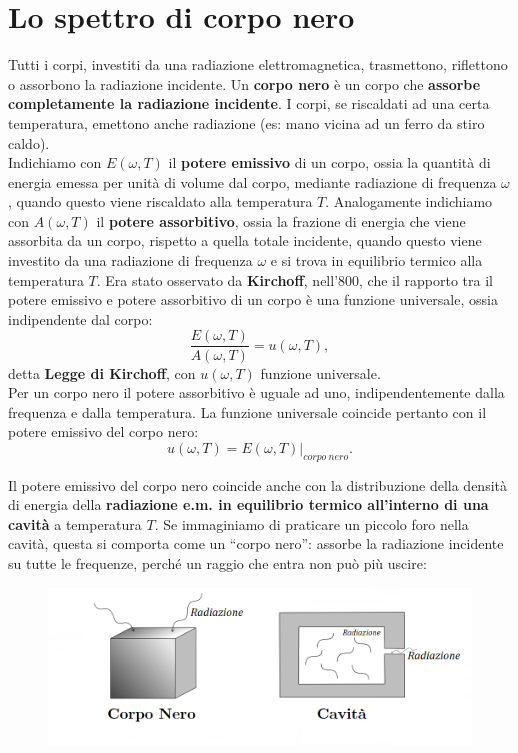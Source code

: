 \documentclass[a4paper,12pt,oneside]{book}
\begin{document}
\section{Lo spettro di corpo nero}
Tutti i corpi, investiti da una radiazione elettromagnetica, trasmettono, riflettono o assorbono la radiazione incidente. Un \textbf{corpo nero} è un corpo che \textbf{assorbe completamente la radiazione incidente}. I corpi, se riscaldati ad una certa temperatura, emettono anche radiazione (es: mano vicina ad un ferro da stiro caldo).\\

Indichiamo con $E(\omega , T) $ il \textbf{potere emissivo} di un corpo, ossia la quantità di energia emessa per unità di volume dal corpo, mediante radiazione di frequenza $\omega$, quando questo viene riscaldato alla temperatura $T$. Analogamente indichiamo con $A(\omega , T )$ il \textbf{potere assorbitivo}, ossia la frazione di energia che viene assorbita da un corpo, rispetto a quella totale incidente, quando questo viene investito da una radiazione di frequenza $\omega$ e si trova in equilibrio termico alla temperatura  $T$.
Era stato osservato da \textbf{Kirchoff}, nell'800, che il rapporto tra il potere emissivo e potere assorbitivo di un corpo è una funzione universale, ossia indipendente dal corpo:
	\begin{equation}
		\boxed{
			\frac{E(\omega ,T)}{A(\omega ,T)}= u(\omega , T),
		}
	\end{equation}
detta \textbf{Legge di Kirchoff}, con $u(\omega , T)$ funzione universale.\\
Per un corpo nero il potere assorbitivo è uguale ad uno, indipendentemente dalla frequenza e dalla temperatura. La funzione universale coincide pertanto con il potere emissivo del corpo nero:
	\begin{equation}
		u(\omega, T)= E(\omega , T)|_{corpo\ nero}.
	\end{equation}
	
Il potere emissivo del corpo nero coincide anche con la distribuzione della densità di energia della \textbf{radiazione e.m. in equilibrio termico all'interno di una cavità} a temperatura $T$. Se immaginiamo di praticare un piccolo foro nella cavità, questa si comporta come un ``corpo nero'': assorbe la radiazione incidente su tutte le frequenze, perché un raggio che entra non può più uscire:\\
	\begin{figure}[!htbp]
		\includegraphics[width=\textwidth]{immagini/cap_1/fig_1_1.png}
	\end{figure}
	
\end{document}

